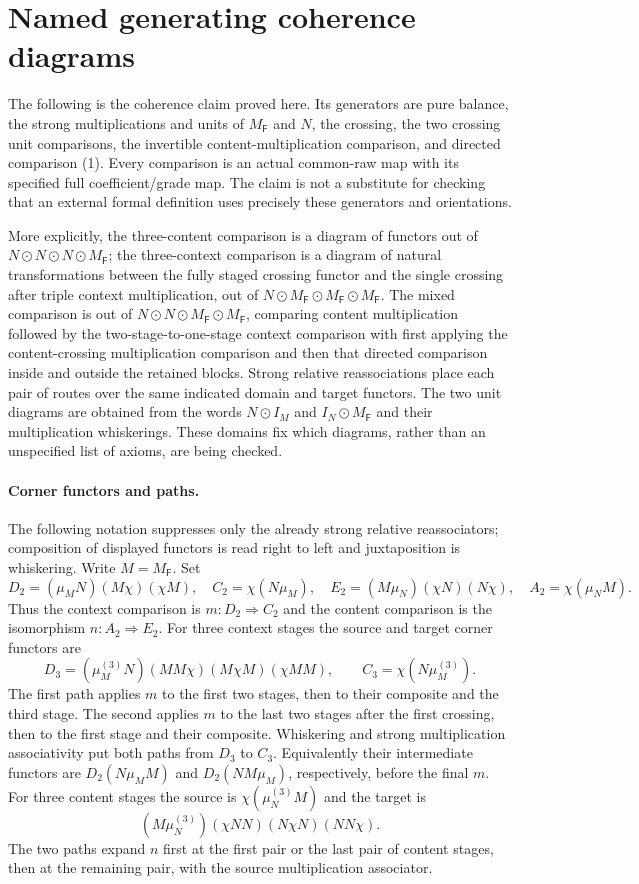 \documentclass[11pt]{article}
\begin{document}
\section{Named generating coherence diagrams}
The following is the coherence claim proved here. Its generators are pure balance, the strong multiplications and units of $M_{\mathsf F}$ and $N$, the crossing, the two crossing unit comparisons, the invertible content-multiplication comparison, and directed comparison (1). Every comparison is an actual common-raw map with its specified full coefficient/grade map. The claim is not a substitute for checking that an external formal definition uses precisely these generators and orientations.

More explicitly, the three-content comparison is a diagram of functors out of $N\odot N\odot N\odot M_{\mathsf F}$; the three-context comparison is a diagram of natural transformations between the fully staged crossing functor and the single crossing after triple context multiplication, out of $N\odot M_{\mathsf F}\odot M_{\mathsf F}\odot M_{\mathsf F}$. The mixed comparison is out of $N\odot N\odot M_{\mathsf F}\odot M_{\mathsf F}$, comparing content multiplication followed by the two-stage-to-one-stage context comparison with first applying the content-crossing multiplication comparison and then that directed comparison inside and outside the retained blocks. Strong relative reassociations place each pair of routes over the same indicated domain and target functors. The two unit diagrams are obtained from the words $N\odot I_M$ and $I_N\odot M_{\mathsf F}$ and their multiplication whiskerings. These domains fix which diagrams, rather than an unspecified list of axioms, are being checked.

\paragraph{Corner functors and paths.} The following notation suppresses only the already strong relative reassociators; composition of displayed functors is read right to left and juxtaposition is whiskering. Write $M=M_{\mathsf F}$. Set
\[
 D_2=(\mu_M N)(M\chi)(\chi M),\quad C_2=\chi(N\mu_M),\quad
 E_2=(M\mu_N)(\chi N)(N\chi),\quad A_2=\chi(\mu_N M).
\]
Thus the context comparison is $m:D_2\Rightarrow C_2$ and the content comparison is the isomorphism $n:A_2\Rightarrow E_2$.
For three context stages the source and target corner functors are
\[
 D_3=(\mu_M^{(3)}N)(MM\chi)(M\chi M)(\chi MM),\qquad
 C_3=\chi(N\mu_M^{(3)}).
\]
The first path applies $m$ to the first two stages, then to their composite and the third stage. The second applies $m$ to the last two stages after the first crossing, then to the first stage and their composite. Whiskering and strong multiplication associativity put both paths from $D_3$ to $C_3$. Equivalently their intermediate functors are $D_2(N\mu_M M)$ and $D_2(NM\mu_M)$, respectively, before the final $m$.
For three content stages the source is $\chi(\mu_N^{(3)}M)$ and the target is
\[
 (M\mu_N^{(3)})(\chi NN)(N\chi N)(NN\chi).
\]
The two paths expand $n$ first at the first pair or the last pair of content stages, then at the remaining pair, with the source multiplication associator.
\end{document}
